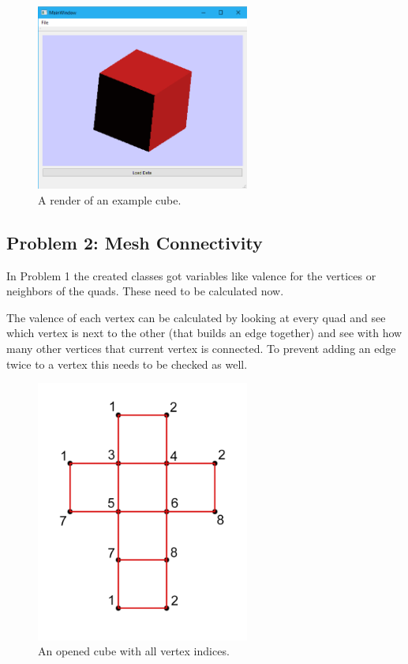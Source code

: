 \documentclass[11.5pt,oneside,a4paper]{scrartcl}
\newcounter{ct}
\begin{document}
\begin{figure}[ht]
\centering
\includegraphics[width=7.0cm]{renderedcube.png}
\caption{\label{ figtorus}
	A render of an example cube.
}
\end{figure}


\subsection{Problem 2: Mesh Connectivity}

In Problem 1 the created classes got variables like valence for the vertices or neighbors of the quads. These need to be calculated now.

The valence of each vertex can be calculated by looking at every quad and see which vertex is next to the other (that builds an edge together) and see with how many other vertices that current vertex is connected. To prevent adding an edge twice to a vertex this needs to be checked as well.

\begin{figure}[ht]
\centering
\includegraphics[width=7.0cm]{cube.png}
\caption{\label{ figtorus}
	An opened cube with all vertex indices.
}
\end{figure}
\end{document}
